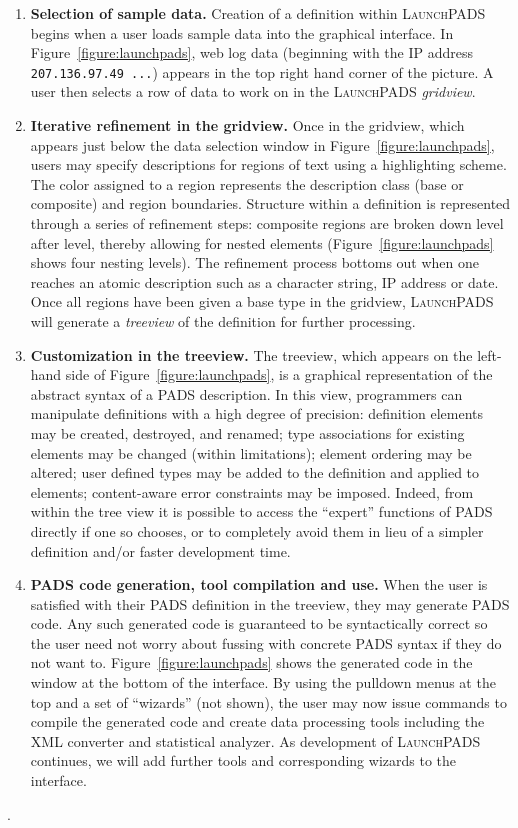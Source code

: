 \documentclass[nocopyrightspace]{sigplanconf}
\begin{document}
\begin{enumerate}
\item {\bf Selection of sample data.} 
Creation of a definition within \textsc{LaunchPADS} begins
when a user loads sample data into the graphical interface.
In Figure~\ref{figure:launchpads}, web log data (beginning with
the IP address {\tt 207.136.97.49 ...}) appears
in the top right hand corner of the picture.  A user then
selects a row of data to work on in the \textsc{LaunchPADS} {\it gridview}.

\item {\bf Iterative refinement in the gridview.}
Once in the gridview, which appears just below
the data selection window in Figure~\ref{figure:launchpads}, 
users may specify descriptions 
for regions of text using a highlighting scheme.  The 
color assigned to a region
represents the description class (base or composite) and region boundaries.  
Structure within a definition is represented through a series of
refinement steps: composite regions are broken down level after 
level, thereby allowing for nested elements (Figure~\ref{figure:launchpads}
shows four nesting levels).  The refinement process bottoms out
when one reaches an atomic description such as a character string,
IP address or date.  Once all regions have
been given a base type in the gridview,  \textsc{LaunchPADS} will generate a
{\it treeview} of the definition for further processing.

\item {\bf Customization in the treeview.}  The treeview,
which appears on the left-hand side of Figure~\ref{figure:launchpads}, is
a graphical representation of the abstract syntax of a PADS description.
In this view, programmers can manipulate definitions with a high degree
of precision: definition elements may be created, destroyed, and
renamed; type associations for existing elements may be changed
(within limitations); element ordering may be altered; user defined
types may be added to the definition and applied to elements;
content-aware error constraints may be imposed.  Indeed, from within
the tree view it is possible to access the ``expert'' functions of
\textsc{PADS} directly if one so chooses, or to completely avoid them
in lieu of a simpler definition and/or faster development time.

\item {\bf \textsc{PADS} code generation, tool compilation and use.}  When 
the user is satisfied with their \textsc{PADS} definition in the treeview,
they may generate \textsc{PADS} code.  Any such generated code is guaranteed 
to be syntactically correct so the user need not worry about fussing with
concrete \textsc{PADS} syntax if they do not want to. 
Figure~\ref{figure:launchpads}
shows the generated code in the window at the bottom of the
interface.  By using the pulldown menus at the top and a set of ``wizards'' 
(not shown), the user may now
issue commands to compile the generated code and create data processing
tools including the XML converter and statistical analyzer.  
As development of \textsc{LaunchPADS} continues, we will add further
tools and corresponding wizards to the interface.
\end{enumerate}.
\end{document}
